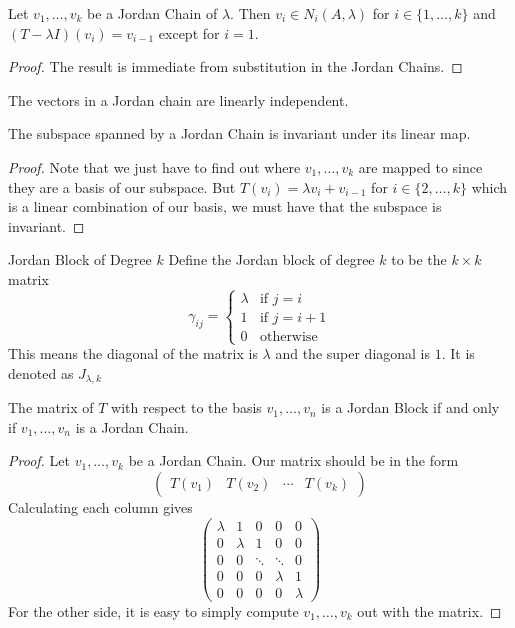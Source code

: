\documentclass[a4paper]{article}
\begin{document}
\begin{crl}{}{} Let $v_1,\dots,v_k$ be a Jordan Chain of $\lambda$. Then $v_i\in N_i(A,\lambda)$ for $i\in\{1,\dots,k\}$ and $(T-\lambda I)(v_i)=v_{i-1}$ except for $i=1$. \tcbline
\begin{proof} The result is immediate from substitution in the Jordan Chains. 
\end{proof}
\end{crl}

\begin{prp}{}{} The vectors in a Jordan chain are linearly independent. 
\end{prp}

\begin{prp}{}{} The subspace spanned by a Jordan Chain is invariant under its linear map. \tcbline
\begin{proof} Note that we just have to find out where $v_1,\dots,v_k$ are mapped to since they are a basis of our subspace. But $T(v_i)=\lambda v_i+v_{i-1}$ for $i\in\{2,\dots,k\}$ which is a linear combination of our basis, we must have that the subspace is invariant. 
\end{proof}
\end{prp}

\begin{defn}{Jordan Block of Degree $k$}{} Define the Jordan block of degree $k$ to be the $k\times k$ matrix $$
\gamma_{ij}=\begin{cases}
\lambda & \text{if $j=i$}\\
1 & \text{if $j=i+1$}\\
0 & \text{otherwise}
\end{cases}$$
This means the diagonal of the matrix is $\lambda$ and the super diagonal is $1$. It is denoted as $J_{\lambda,k}$
\end{defn}

\begin{crl}{}{} The matrix of $T$ with respect to the basis $v_1,\dots,v_n$ is a Jordan Block if and only if $v_1,\dots,v_n$ is a Jordan Chain. \tcbline
\begin{proof} Let $v_1,\dots,v_k$ be a Jordan Chain. Our matrix should be in the form $$\begin{pmatrix}
T(v_1) & T(v_2) & \cdots & T(v_k) 
\end{pmatrix}$$ Calculating each column gives $$\begin{pmatrix}
\lambda & 1 & 0 & 0 & 0\\
0 & \lambda & 1 & 0 & 0\\
0 & 0 & \ddots & \ddots & 0\\
0 & 0 & 0 & \lambda & 1\\
0 & 0 & 0 & 0 & \lambda
\end{pmatrix}$$
For the other side, it is easy to simply compute $v_1,\dots,v_k$ out with the matrix. 
\end{proof}
\end{crl}
\end{document}
